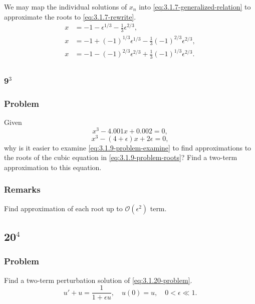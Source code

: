 \documentclass[12pt]{article}
\begin{document}
We may map the individual solutions of $x_n$ into
\cref{eq:3.1.7-generalized-relation} to approximate the roots to
\cref{eq:3.1.7-rewrite}.
\begin{equation*}
  \boxed{
    \begin{aligned}
      x &= -1 - \epsilon^{1/3} - \frac{1}{3}\epsilon^{2/3}, \\
      x &= -1 + {(-1)}^{1/3}\epsilon^{1/3} - \frac{1}{3}{(-1)}^{2/3}\epsilon^{2/3}, \\
      x &= -1 - {(-1)}^{2/3}\epsilon^{2/3} + \frac{1}{3}{(-1)}^{1/3}\epsilon^{2/3}. \\
    \end{aligned}
  }
\end{equation*}

\subsubsection{9$^3$}
\subsubsection*{Problem}
Given
\begin{equation}
  \label{eq:3.1.9-problem-roots}
  x^3-4.001x+0.002=0,
\end{equation}
\begin{equation}
  \label{eq:3.1.9-problem-examine}
  x^3-(4+\epsilon)x+2\epsilon=0,
\end{equation}
why is it easier to examine \cref{eq:3.1.9-problem-examine} to find
approximations to the roots of the cubic equation in
\cref{eq:3.1.9-problem-roots}? Find a two-term approximation to this equation.
\subsubsection*{Remarks}
Find approximation of each root up to $\mathcal{O}(\epsilon^2)$ term.

\subsection{20$^4$}
\subsubsection*{Problem}
Find a two-term perturbation solution of \cref{eq:3.1.20-problem}.
\begin{equation}
  \label{eq:3.1.20-problem}
  u'+u=\frac{1}{1+\epsilon u},\quad u(0)=u,\quad 0<\epsilon\ll1.
\end{equation}
\end{document}
